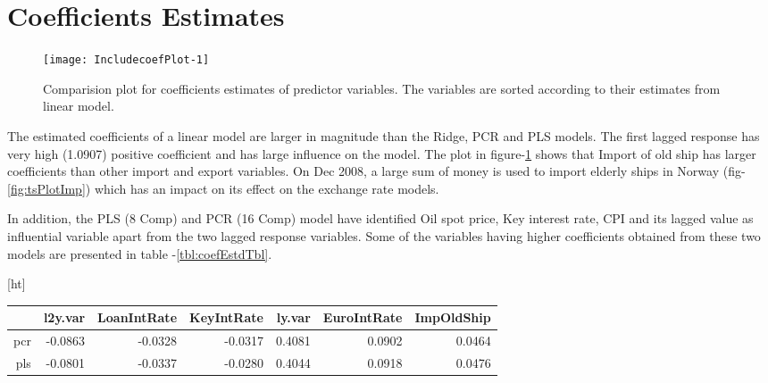 \documentclass[12pt, lot, lof]{thesis}\usepackage[]{graphicx}\usepackage[]{color}
\makeatletter
\def\maxwidth{ %
  \ifdim\Gin@nat@width>\linewidth
    \linewidth
  \else
    \Gin@nat@width
  \fi
}
\renewenvironment{table}%
  {\renewcommand{\familydefault}{\sfdefault}\selectfont
  \@float{table}}
  {\end@float}
\makeatother
\begin{document}
\section{Coefficients Estimates}
\label{sec:coefEst}

\begin{Schunk}
\begin{figure}[htpb]

{\centering \texttt{[image: IncludecoefPlot-1]} 

}

\caption[Cofficients estimates for predictor variables]{Comparision plot for coefficients estimates of predictor variables. The variables are sorted according to their estimates from linear model.\label{fig:coefPlot}}
\end{figure}
\end{Schunk}
The estimated coefficients of a linear model are larger in magnitude than the Ridge, PCR and PLS models. The first lagged response has very high (1.0907) positive coefficient and has large influence on the model. The plot in figure-\ref{fig:coefPlot} shows that Import of old ship has larger coefficients than other import and export variables. On Dec 2008, a large sum of money is used to import elderly ships in Norway (fig-\ref{fig:tsPlotImp}) which has an impact on its effect on the exchange rate models.

In addition, the PLS (8 Comp) and PCR (16 Comp) model have identified Oil spot price, Key interest rate, CPI and its lagged value as influential variable apart from the two lagged response variables. Some of the variables having higher coefficients obtained from these two models are presented in table -\ref{tbl:coefEstdTbl}.

{\singlespacing\scriptsize
\begin{table}[ht]
\centering
\caption[Coefficient Estimate for PLS and PCR model]{Top three (both positive and negative) Coefficient Estimate of PLS and PCR model} 
\label{tbl:coefEstdTbl}
\begin{tabular}{rrrrrrr}
  \hline
 & l2y.var & LoanIntRate & KeyIntRate & ly.var & EuroIntRate & ImpOldShip \\ 
  \hline
pcr & -0.0863 & -0.0328 & -0.0317 & 0.4081 & 0.0902 & 0.0464 \\ 
  pls & -0.0801 & -0.0337 & -0.0280 & 0.4044 & 0.0918 & 0.0476 \\ 
   \hline
\end{tabular}
\end{table}

}
\end{document}
